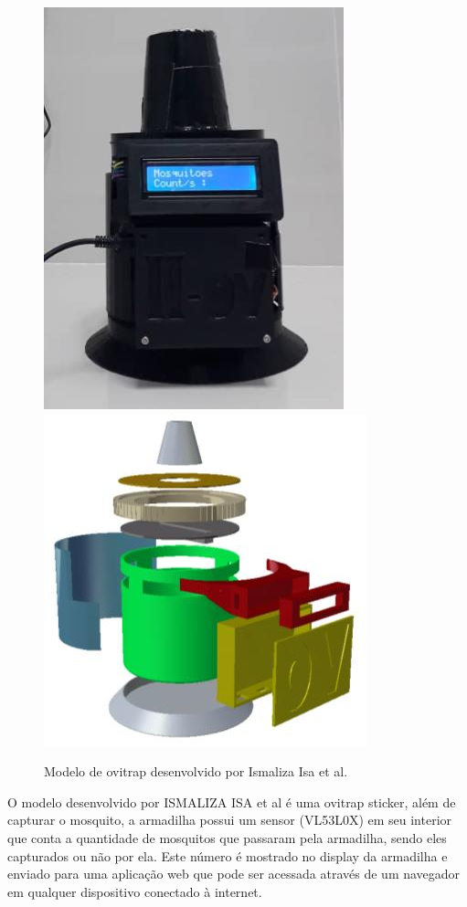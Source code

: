 \documentclass[
	12pt,				%
	openright,			%
	oneside,			%
	a4paper,			%
	chapter=TITLE,		%
	english,			%
	brazil				%
	]{abntex2}
\begin{document}
\begin{figure}[H]
\centering
\includegraphics[scale=0.4]{imagens/smartovitrap.png}
\includegraphics[scale=0.5]{imagens/smartovitrap2.png}
 \caption{Modelo de ovitrap desenvolvido por Ismaliza Isa et al. }
    \label{fig:ovitrapIsmaliza}
\end{figure}

O modelo desenvolvido por ISMALIZA ISA et al é uma ovitrap sticker,
além de capturar o mosquito, a armadilha possui um sensor (VL53L0X) em seu interior que conta a
quantidade de mosquitos que passaram pela armadilha, sendo eles capturados ou não por
ela. Este número é mostrado no display da armadilha e enviado para uma aplicação web
que pode ser acessada através de um navegador em qualquer dispositivo conectado à
internet.
\end{document}
